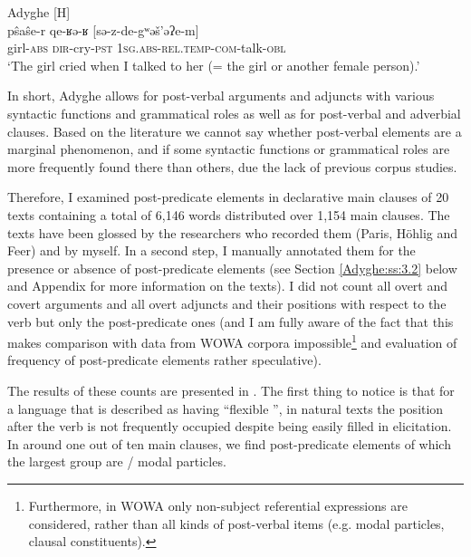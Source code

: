 \documentclass[output=paper,colorlinks,citecolor=brown, draft]{langscibook}
\begin{document}
\ea\label{Adyghe:ex:28}
Adyghe \citep[691]{testelets2009nevyražennye} [H] \\
\gll pŝaŝe-r qe-ʁə-ʁ [sə-z-de-gʷəš'əʔe-m] \\
girl\textsc{-abs} \textsc{dir-}cry\textsc{-pst} \textsc{1sg.}\textsc{abs-}\textsc{rel.}\textsc{temp-}\textsc{com-}talk\textsc{-obl} \\
\glt `The girl cried when I talked to her (= the girl or another female person).' 
\z

\begin{sloppypar}
In short, Adyghe allows for post-verbal arguments and adjuncts with various syntactic functions and grammatical roles as well as for post-verbal  and adverbial clauses. Based on the literature we cannot say whether post-verbal elements are a marginal phenomenon, and if some syntactic functions or grammatical roles are more frequently found there than others, due the lack of previous corpus studies. 
\end{sloppypar}

Therefore, I examined post-predicate elements in declarative main clauses of 20 texts containing a total of 6,146 words distributed over 1,154 main clauses. The texts have been glossed by the researchers who recorded them (Paris, Höhlig and Feer) and by myself. In a second step, I manually annotated them for the presence or absence of post-predicate elements (see Section \ref{Adyghe:ss:3.2} below and Appendix for more information on the texts). I did not count all overt and covert arguments and all overt adjuncts and their positions with respect to the verb but only the post-predicate ones (and I am fully aware of the fact that this makes comparison with data from WOWA corpora impossible\footnote{
Furthermore, in WOWA only non-subject referential expressions are considered, rather than all kinds of post-verbal items (e.g. modal particles, clausal constituents). 
} and evaluation of frequency of post-predicate elements rather speculative). 

The results of these counts are presented in . The first thing to notice is that for a language that is described as having ``flexible '', in natural texts the position after the verb is not frequently occupied despite being easily filled in elicitation. In around one out of ten main clauses, we find post-predicate elements of which the largest group are  / modal particles.
\end{document}
